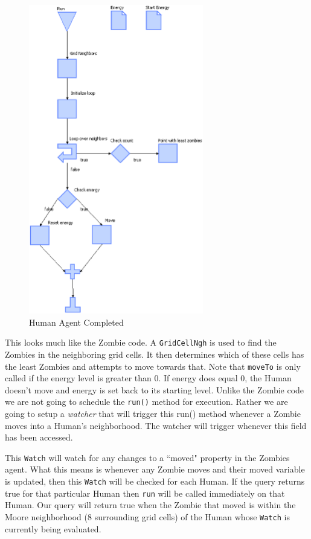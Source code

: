 \documentclass[11pt]{amsart}
\begin{document}
\begin{figure}[p]
\begin{center}
\vspace{.2in}
\centerline {
\includegraphics[width=3in]{figs/Human_complete.eps}
}
\caption{Human Agent Completed}
\label{fig:humancomplete}
\end{center}\end{figure}

\FloatBarrier

This looks much like the Zombie code. A \texttt{GridCellNgh} is used to find the Zombies in the neighboring grid cells. It then determines which of these cells has the least Zombies and attempts to move towards that. Note that \texttt{moveTo} is only called if the energy level is greater than 0. If energy does equal 0, the Human doesn't move and energy is set back to its starting level.  Unlike the Zombie code we are not going to schedule the \texttt{run()} method for execution. Rather we are going to setup a \textit{watcher} that will trigger this run() method whenever a Zombie moves into a Human's neighborhood.  The watcher will trigger whenever this field has been accessed.

This \texttt{Watch} will watch for any changes to a ``moved" property in the Zombies agent. What this means is whenever any Zombie moves and their moved variable is updated, then this \texttt{Watch} will be checked for each Human. If the query returns true for that particular Human then \texttt{run} will be called immediately on that Human. Our query will return true when the Zombie that moved is within the Moore neighborhood (8 surrounding grid cells) of the Human whose \texttt{Watch} is currently being evaluated.
\end{document}
